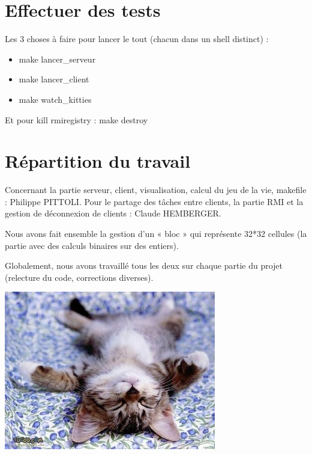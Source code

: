 \documentclass[twoside]{article}
\begin{document}
\section{Effectuer des tests}
Les 3 choses à faire pour lancer le tout (chacun dans un shell distinct) :
\begin{itemize}
	\item make lancer\_serveur
	\item make lancer\_client
	\item make watch\_kitties
\end{itemize}
Et pour kill rmiregistry :
	make destroy

\section{Répartition du travail}
Concernant la partie serveur, client, visualisation, calcul du jeu de la vie, makefile : Philippe PITTOLI.
Pour le partage des tâches entre clients, la partie RMI et la gestion de déconnexion de clients : Claude HEMBERGER.

Nous avons fait ensemble la gestion d'un « bloc » qui représente 32*32 cellules (la partie avec des calculs binaires sur des entiers).

Globalement, nous avons travaillé tous les deux sur chaque partie du projet (relecture du code, corrections diverses).

\begin{center} 
	\includegraphics[scale=0.5]{img/chaton.jpg}
\end{center}
\end{document}
